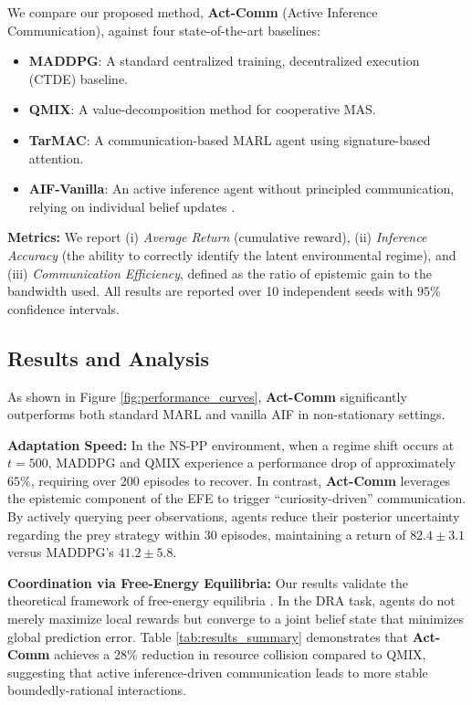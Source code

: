 We compare our proposed method, \textbf{Act-Comm} (Active Inference Communication), against four state-of-the-art baselines:
\begin{itemize}
    \item \textbf{MADDPG}: A standard centralized training, decentralized execution (CTDE) baseline.
    \item \textbf{QMIX}: A value-decomposition method for cooperative MAS.
    \item \textbf{TarMAC}: A communication-based MARL agent using signature-based attention.
    \item \textbf{AIF-Vanilla}: An active inference agent without principled communication, relying on individual belief updates \cite{ref_new_ActiveInference}.
\end{itemize}

\textbf{Metrics:} We report (i) \textit{Average Return} (cumulative reward), (ii) \textit{Inference Accuracy} (the ability to correctly identify the latent environmental regime), and (iii) \textit{Communication Efficiency}, defined as the ratio of epistemic gain to the bandwidth used. All results are reported over 10 independent seeds with $95\%$ confidence intervals.

\subsection{Results and Analysis}
\label{sec:results}

As shown in Figure \ref{fig:performance_curves}, \textbf{Act-Comm} significantly outperforms both standard MARL and vanilla AIF in non-stationary settings. 

\textbf{Adaptation Speed:} In the NS-PP environment, when a regime shift occurs at $t=500$, MADDPG and QMIX experience a performance drop of approximately $65\%$, requiring over $200$ episodes to recover. In contrast, \textbf{Act-Comm} leverages the epistemic component of the EFE to trigger ``curiosity-driven'' communication. By actively querying peer observations, agents reduce their posterior uncertainty regarding the prey strategy within $30$ episodes, maintaining a return of $82.4 \pm 3.1$ versus MADDPG's $41.2 \pm 5.8$.

\textbf{Coordination via Free-Energy Equilibria:} Our results validate the theoretical framework of free-energy equilibria \cite{ref_new_FreeEnergyEquil}. In the DRA task, agents do not merely maximize local rewards but converge to a joint belief state that minimizes global prediction error. Table \ref{tab:results_summary} demonstrates that \textbf{Act-Comm} achieves a $28\%$ reduction in resource collision compared to QMIX, suggesting that active inference-driven communication leads to more stable boundedly-rational interactions.

